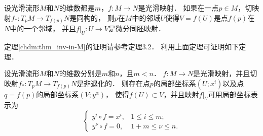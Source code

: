 \begin{theorem}\label{chdm:thm_inv-in-M}
    设光滑流形$M$和$N$的维数都是$m$，$f:M\to N$是光滑映射．
    如果在一点$p\in M$，切映射$f_{*}:T_p M\to T_{f(p)}N$是同构的，
    则$p$在$M$中的邻域$U$使得$V=f(U)$是点$f(p)$在$N$中的一个邻域，
    并且$f|_U :U\to V$是微分同胚映射．
\end{theorem}
定理\ref{chdm:thm_inv-in-M}的证明请参考\parencite[\S 1.3]{cc2001-zh}定理3.2．
利用上面定理可证明如下定理．
\begin{theorem}\label{chdm:thm_immerse-1}
    设光滑流形$M$和$N$的维数分别是$m$和$n$，且$m<n$．
    $f:M\to N$是光滑映射，并且切映射$f_{*}:T_p M\to T_{f(p)}N$是非退化的．
    则存在点$p$的局部坐标系$(U;x^i)$以及点$q=f(p)$的局部坐标系$(V;y^\alpha)$，
    使得$f(U)\subset V$，并且映射$f|_U$可用局部坐标表示为
    \begin{equation}
        \begin{cases}
            y^i \circ f = x^i, & 1 \leqslant i \leqslant m ; \\ 
            y^\nu \circ f = 0, & 1+m \leqslant \nu \leqslant n .
        \end{cases}
    \end{equation}
\end{theorem}
